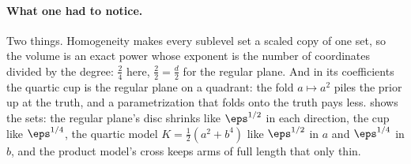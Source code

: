 \begin{refsection}
\paragraph{What one had to notice.} Two things. Homogeneity makes every sublevel set a scaled copy of one set, so the volume is an exact power whose exponent is the number of coordinates divided by the degree: $\frac24$ here, $\frac22=\frac d2$ for the regular plane. And in its coefficients the quartic cup is the regular plane on a quadrant: the fold $a\mapsto a^2$ piles the prior up at the truth, and a parametrization that folds onto the truth pays less.  shows the sets: the regular plane's disc shrinks like $\eps^{1/2}$ in each direction, the cup like $\eps^{1/4}$, the quartic model $K=\frac12(a^2+b^4)$ like $\eps^{1/2}$ in $a$ and $\eps^{1/4}$ in $b$, and the product model's cross keeps arms of full length that only thin.


\end{refsection}

